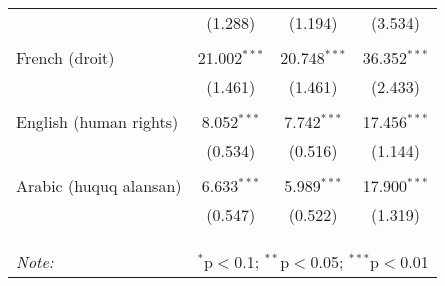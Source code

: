 \begin{table}[!htbp]
\begin{tabular}{@{\extracolsep{5pt}}lccc}
  & (1.288) & (1.194) & (3.534) \\ 
  & & & \\ 
 French (droit) & 21.002$^{***}$ & 20.748$^{***}$ & 36.352$^{***}$ \\ 
  & (1.461) & (1.461) & (2.433) \\ 
  & & & \\ 
 English (human rights) & 8.052$^{***}$ & 7.742$^{***}$ & 17.456$^{***}$ \\ 
  & (0.534) & (0.516) & (1.144) \\ 
  & & & \\ 
 Arabic (huquq alansan) & 6.633$^{***}$ & 5.989$^{***}$ & 17.900$^{***}$ \\ 
  & (0.547) & (0.522) & (1.319) \\ 
  & & & \\ 
\hline \\[-1.8ex] 
\hline 
\hline \\[-1.8ex] 
\textit{Note:}  & \multicolumn{3}{r}{$^{*}$p$<$0.1; $^{**}$p$<$0.05; $^{***}$p$<$0.01} \\ 
\end{tabular} 
\end{table} 
